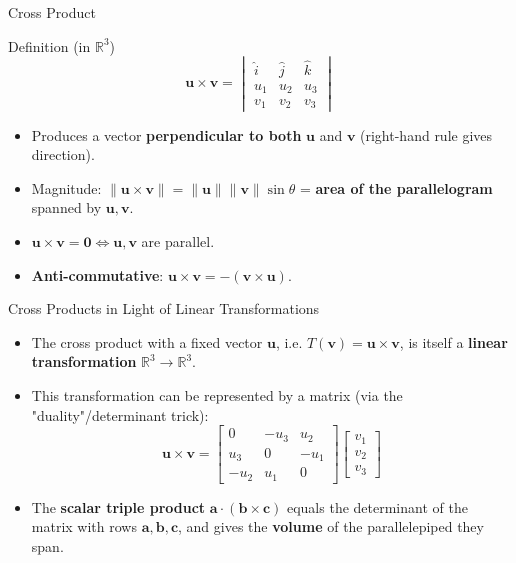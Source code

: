 \documentclass[9pt,aspectratio=169]{beamer}
\newcommand{\R}{\mathbb{R}}
\newcommand{\vect}[1]{\mathbf{#1}}
\begin{document}
\begin{frame}{Cross Product}
\begin{block}{Definition (in $\R^3$)}
$$\vect{u}\times \vect{v} = \begin{vmatrix} \hat{i} & \hat{j} & \hat{k} \\ u_1&u_2&u_3\\ v_1&v_2&v_3\end{vmatrix}$$
\end{block}
\begin{itemize}
\item Produces a vector \textbf{perpendicular to both} $\vect{u}$ and $\vect{v}$ (right-hand rule gives direction).
\item Magnitude: $\|\vect{u}\times\vect{v}\| = \|\vect{u}\|\|\vect{v}\|\sin\theta$ = \textbf{area of the parallelogram} spanned by $\vect{u}, \vect{v}$.
\item $\vect{u}\times\vect{v} = \vect{0} \iff \vect{u}, \vect{v}$ are parallel.
\item \textbf{Anti-commutative}: $\vect{u}\times\vect{v} = -(\vect{v}\times\vect{u})$.
\end{itemize}
\end{frame}

\begin{frame}{Cross Products in Light of Linear Transformations}
\begin{itemize}
\item The cross product with a fixed vector $\vect{u}$, i.e. $T(\vect{v}) = \vect{u}\times\vect{v}$, is itself a \textbf{linear transformation} $\R^3\to\R^3$.
\item This transformation can be represented by a matrix (via the "duality"/determinant trick):
$$\vect{u}\times\vect{v} = \begin{bmatrix}0&-u_3&u_2\\u_3&0&-u_1\\-u_2&u_1&0\end{bmatrix}\begin{bmatrix}v_1\\v_2\\v_3\end{bmatrix}$$
\item The \textbf{scalar triple product} $\vect{a}\cdot(\vect{b}\times\vect{c})$ equals the determinant of the matrix with rows $\vect{a},\vect{b},\vect{c}$, and gives the \textbf{volume} of the parallelepiped they span.
\end{itemize}
\end{frame}
\end{document}
